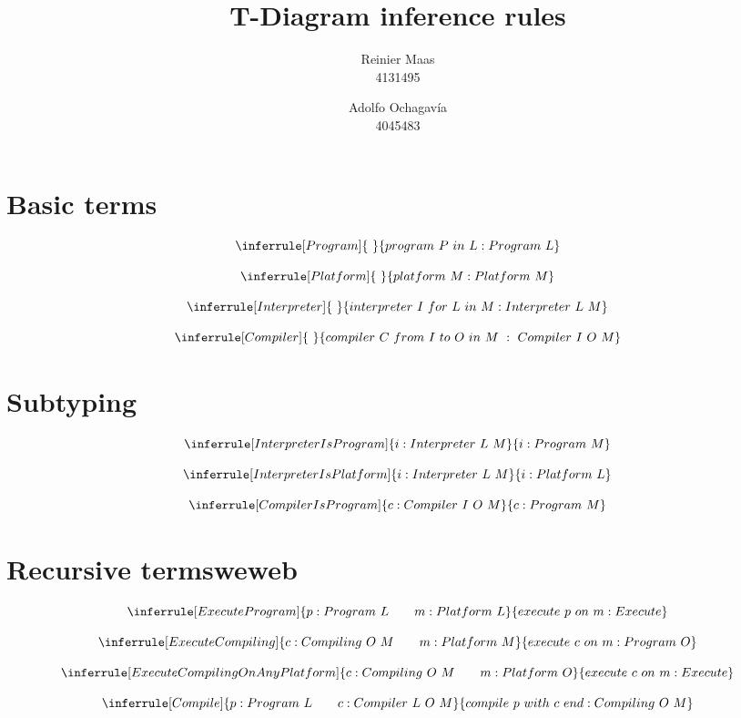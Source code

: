 \documentclass{article}
\author{
  Reinier Maas \\ 4131495
  \and
  Adolfo Ochagavía \\ 4045483
}
\title{T-Diagram inference rules}
\begin{document}
\maketitle


\section*{Basic terms}

\[
\inferrule[Program]{\ }{program\ P\ in\ L : Program\ L}
\]

\[
\inferrule[Platform]{\ }{platform\ M : Platform\ M}
\]

\[
\inferrule[Interpreter]{\ }{interpreter\ I\ for\ L\ in\ M : Interpreter\ L\ M}
\]

\[
\inferrule[Compiler]{\ }{compiler\ C\ from\ I\ to\ O\ in\ M\ :\ Compiler\ I\ O\ M}
\]

\section*{Subtyping}

\[
\inferrule[InterpreterIsProgram]{i : Interpreter\ L\ M}{i : Program\ M}
\]

\[
\inferrule[InterpreterIsPlatform]{i : Interpreter\ L\ M}{i : Platform\ L}
\]

\[
\inferrule[CompilerIsProgram]{c : Compiler\ I\ O\ M}{c : Program\ M}
\]

\section*{Recursive termsweweb}

\[
\inferrule[ExecuteProgram]{p : Program\ L \qquad m : Platform\ L}{execute\ p\ on\ m : Execute}
\]

\[
\inferrule[ExecuteCompiling]{c : Compiling\ O\ M \qquad m : Platform\ M}{execute\ c\ on\ m : Program\ O}
\]

\[
\inferrule[ExecuteCompilingOnAnyPlatform]{c : Compiling\ O\ M \qquad m : Platform\ O}{execute\ c\ on\ m : Execute}
\]

\[
\inferrule[Compile]{p : Program\ L \qquad c : Compiler\ L\ O\ M}{compile\ p\ with\ c\ end : Compiling\ O\ M}
\]
\end{document}
